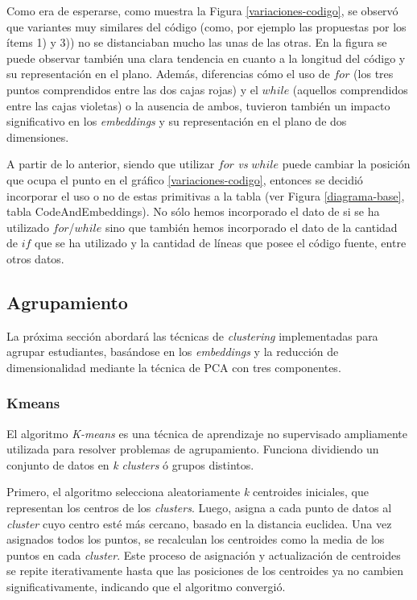 \documentclass[11pt,a4paper,twoside,openany]{tesis}
\begin{document}
Como era de esperarse, como muestra la Figura \ref{variaciones-codigo}, se observó que variantes muy similares del código (como, por ejemplo las propuestas por los ítems 1) y 3)) no se distanciaban mucho las unas de las otras. En la figura se puede observar también una clara tendencia en cuanto a la longitud del código y su representación en el plano. Además, diferencias cómo el uso de $for$ (los tres puntos comprendidos entre las dos cajas rojas) y el $while$ (aquellos comprendidos entre las cajas violetas) o la ausencia de ambos, tuvieron también un impacto significativo en los \emph{embeddings} y su representación en el plano de dos dimensiones.

A partir de lo anterior, siendo que utilizar $for$ \emph{vs} $while$ puede cambiar la posición que ocupa el punto en el gráfico \ref{variaciones-codigo}, entonces se decidió incorporar el uso o no de estas primitivas a la tabla (ver Figura \ref{diagrama-base}, tabla CodeAndEmbeddings). No sólo hemos incorporado el dato de si se ha utilizado $for$/$while$ sino que también hemos incorporado el dato de la cantidad de $if$ que se ha utilizado y la cantidad de líneas que posee el código fuente, entre otros datos.

\subsection{Agrupamiento}

La próxima sección abordará las técnicas de \emph{clustering} implementadas para agrupar estudiantes, basándose en los \emph{embeddings} y la reducción de dimensionalidad mediante la técnica de PCA con tres componentes.

\subsubsection{Kmeans}\textbf{ } 

El algoritmo \emph{K-means} es una técnica de aprendizaje no supervisado ampliamente utilizada para resolver problemas de agrupamiento. Funciona dividiendo un conjunto de datos en \emph{k} \emph{clusters} ó grupos distintos. 

Primero, el algoritmo selecciona aleatoriamente \emph{k} centroides iniciales, que representan los centros de los \emph{clusters}. Luego, asigna a cada punto de datos al \emph{cluster} cuyo centro esté más cercano, basado en la distancia euclidea. Una vez asignados todos los puntos, se recalculan los centroides como la media de los puntos en cada \emph{cluster}. Este proceso de asignación y actualización de centroides se repite iterativamente hasta que las posiciones de los centroides ya no cambien significativamente, indicando que el algoritmo convergió. \cite{kmeans}
\end{document}
